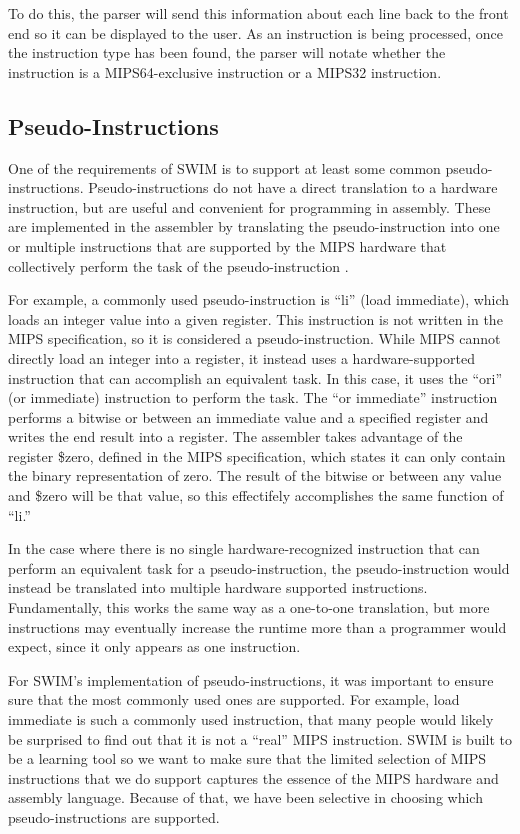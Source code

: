 \documentclass[
    parskip=half,
    fontsize=12pt,
    titlepage=firstiscover,
    toc=bibliography,
    numbers=endperiod
]{scrartcl}
\begin{document}
To do this, the parser will send this information about each line back
to the front end so it can be displayed to the user. As an instruction
is being processed, once the instruction type has been found, the parser
will notate whether the instruction is a MIPS64-exclusive instruction or
a MIPS32 instruction.

\subsection{Pseudo-Instructions}

One of the requirements of SWIM is to support at least some common
pseudo-instructions. Pseudo-instructions do not have a direct
translation to a hardware instruction, but are useful and convenient for
programming in assembly. These are implemented in the assembler by
translating the pseudo-instruction into one or multiple instructions
that are supported by the MIPS hardware that collectively perform the
task of the pseudo-instruction \cite{koehn-pseudoinstructions}.

For example, a commonly used pseudo-instruction is ``li'' (load
immediate), which loads an integer value into a given register. This
instruction is not written in the MIPS specification, so it is
considered a pseudo-instruction. While MIPS cannot directly load an
integer into a register, it instead uses a hardware-supported
instruction that can accomplish an equivalent task. In this case, it
uses the ``ori'' (or immediate) instruction to perform the task. The
``or immediate'' instruction performs a bitwise or between an immediate
value and a specified register and writes the end result into a
register. The assembler takes advantage of the register \$zero, defined
in the MIPS specification, which states it can only contain the binary
representation of zero. The result of the bitwise or between any value
and \$zero will be that value, so this effectifely accomplishes the same
function of ``li.''

In the case where there is no single hardware-recognized instruction
that can perform an equivalent task for a pseudo-instruction, the
pseudo-instruction would instead be translated into multiple hardware
supported instructions. Fundamentally, this works the same way as a
one-to-one translation, but more instructions may eventually increase
the runtime more than a programmer would expect, since it only appears
as one instruction.

For SWIM's implementation of pseudo-instructions, it was important to
ensure sure that the most commonly used ones are supported. For example,
load immediate is such a commonly used instruction, that many people
would likely be surprised to find out that it is not a ``real'' MIPS
instruction. SWIM is built to be a learning tool so we want to make sure
that the limited selection of MIPS instructions that we do support
captures the essence of the MIPS hardware and assembly language. Because
of that, we have been selective in choosing which pseudo-instructions
are supported.
\end{document}
